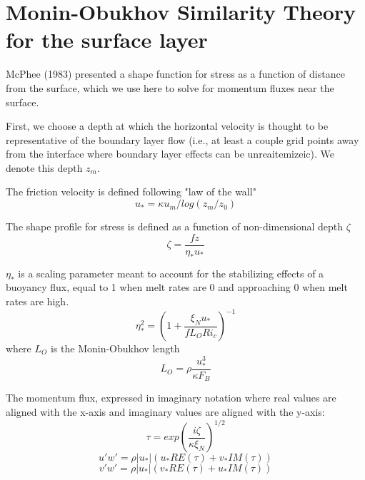 \documentclass[letterpaper,10pt]{report}
\begin{document}
	\section{Monin-Obukhov Similarity Theory for the surface layer}
    McPhee (1983) presented a shape function for stress as a function of distance from the surface, which we use here to solve for momentum fluxes near the surface. 
    
    First, we choose a depth at which the horizontal velocity is thought to be representative of the boundary layer flow (i.e., at least a couple grid points away from the interface where boundary layer effects can be unreaitemizeic). We denote this depth $z_m$. 
    
    The friction velocity is defined following "law of the wall"
    \begin{equation}
        u_* = \kappa u_m / log(z_m/z_0)
    \end{equation}
    
    The shape profile for stress is defined as a function of non-dimensional depth $\zeta$
    \begin{equation}
        \zeta = \frac{f z}{\eta_* u_*}
    \end{equation}
    
    $\eta_*$ is a scaling parameter meant to account for the stabilizing effects of a buoyancy flux, equal to 1 when melt rates are 0 and approaching 0 when melt rates are high.
    \begin{equation}
        \eta_*^2 = (1+\frac{\xi_N u_*}{f L_O Ri_c})^{-1}
    \end{equation}
    where $L_O$ is the Monin-Obukhov length
    \begin{equation}
        L_O = \rho \frac{u_*^3}{\kappa F_{B}}
    \end{equation}
    
    The momentum flux, expressed in imaginary notation where real values are aligned with the x-axis and imaginary values are aligned with the y-axis:
    \begin{equation}
        \tau = exp(\frac{i \zeta}{\kappa \xi_N})^{1/2}
    \end{equation}
    \begin{equation}
        u'w' = \rho |u_*| (u_* RE(\tau) + v_* IM(\tau))
    \end{equation}
    \begin{equation}
        v'w' = \rho |u_*|(v_* RE(\tau) + u_* IM(\tau))
    \end{equation}
    \newpage
\end{document}
